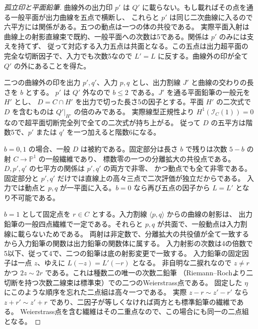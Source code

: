 \begin{proof}[孤立印と平面鉛筆]
曲線外の出力印 $p'$ は $Q'$ に載らない。もし載ればその点を通る一般平面が出力曲線を五点で横断し、
これらと $p'$ は同じ二次曲線に入るので六平方には関係がある。五つの動点は一つの体の共役である。
実際平面入射は曲線上の射影直線束で既約、一般平面への次数は5である。関係は $p'$ のみには支えを持てず、
従って対応する入力五点は共面となる。この五点は出力超平面の完全な切断因子で、入力でも次数5なので
$L'=L$ に反する。曲線外の印が全て $Q'$ の外にあることを得た。

二つの曲線外の印を出力 $p',q'$、入力 $p,q$ とし、出力割線 $J'$ と曲線の交わりの長さを $b$ とする。
$p'$ は $Q'$ 外なので $b\le2$ である。$J'$ を通る平面鉛筆の一般元を $H'$ とし、
$D=C\cap H'$ を出力で切った長さ5の因子とする。平面 $H'$ の二次式で $D$ を含むものは $Q'|_{H'}$ の倍のみである。
実際線型正規性より $H^1(\mathcal I_C(1))=0$ なので超平面切断完全列で全ての二次式が持ち上がる。
従って $D$ の五平方は階数5で、$p'$ または $q'$ を一つ加えると階数6になる。

$b=0,1$ の場合、一般 $D$ は被約である。固定部分は長さ $b$ で残りは次数 $5-b$ の射 $C\to\mathbb P^1$ の一般繊維であり、
標数零の一つの分離拡大の共役点である。$D,p',q'$ の七平方の関係は $p',q'$ の両方で非零、
かつ動点でも全て非零である。固定部分と $p',q'$ だけでは直線上の高々三点で二次評価が独立だからである。
入力では動点と $p,q$ が一平面に入る。$b=0$ なら再び五点の因子から $L=L'$ となり不可能である。

$b=1$ として固定点を $r\in C$ とする。入力割線 $\langle p,q\rangle$ からの曲線の射影は、
出力鉛筆の一般四点繊維で一定である。それらと $p,q$ が共面で、一般動点は入力割線に載らないためである。
両射は非定数で、分離拡大の共役値が全て一致するから入力鉛筆の関数は出力鉛筆の関数体に属する。
入力射影の次数は4の倍数で5以下、従って4で、二つの鉛筆は底の射影変更で一致する。
入力鉛筆の固定因子は一点 $z$、ゆえに $L(-z)=L'(-r)$ となる。
非自明な二捩れなので $z\ne r$ かつ $2z\sim2r$ である。これは種数二の唯一の次数二鉛筆
（Riemann--Rochより二切断を持つ次数二線束は標準束）での二つのWeierstrass点である。
固定した $\eta$ にこのような順序を忘れた二点組は高々一つである。
実際 $z-r\sim z'-r'$ なら $z+r'\sim z'+r$ であり、二因子が等しくなければ両方とも標準鉛筆の繊維である。
Weierstrass点を含む繊維はその二重点なので、この場合にも同一の二点組となる。
\end{proof}
